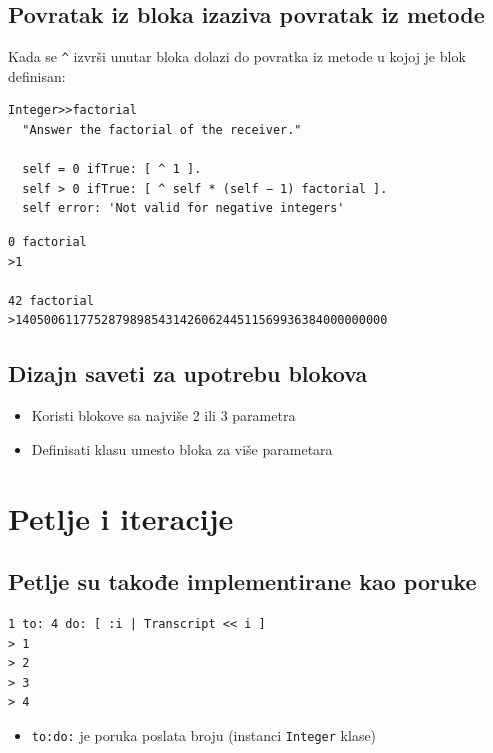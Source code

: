 \documentclass[presentation]{beamer}
\begin{document}
\subsection{Povratak iz bloka izaziva povratak iz metode}
\label{sec:orgb5f63f3}

Kada se \texttt{\textasciicircum{}} izvrši unutar bloka dolazi do povratka iz metode u kojoj je blok
definisan:

\begin{verbatim}
Integer>>factorial
  "Answer the factorial of the receiver."

  self = 0 ifTrue: [ ^ 1 ].
  self > 0 ifTrue: [ ^ self * (self − 1) factorial ].
  self error: 'Not valid for negative integers'
\end{verbatim}

\begin{verbatim}
0 factorial
>1

42 factorial
>1405006117752879898543142606244511569936384000000000
\end{verbatim}

\subsection{Dizajn saveti za upotrebu blokova}
\label{sec:org43d7f8a}

\begin{itemize}
\item Koristi blokove sa najviše 2 ili 3 parametra
\item Definisati klasu umesto bloka za više parametara
\end{itemize}

\section{Petlje i iteracije}
\label{sec:orgf9e706e}
\subsection{Petlje su takođe implementirane kao poruke}
\label{sec:org4439f95}

\begin{verbatim}
1 to: 4 do: [ :i | Transcript << i ]
> 1
> 2
> 3
> 4
\end{verbatim}

\begin{itemize}
\item \texttt{to:do:} je poruka poslata broju (instanci \texttt{Integer} klase)
\end{itemize}
\end{document}
